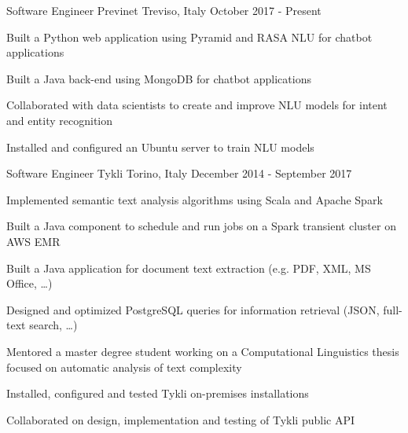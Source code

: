 

\begin{cventries}

  \cventry
    {Software Engineer} %
    {Previnet} %
    {Treviso, Italy} %
    {October 2017 - Present} %
    {
      \begin{cvitems} %
        \item {Built a Python web application using Pyramid and RASA NLU for chatbot applications}
        \item {Built a Java back-end using MongoDB for chatbot applications}
        \item {Collaborated with data scientists to create and improve NLU models for intent and entity recognition}
        \item {Installed and configured an Ubuntu server to train NLU models}
      \end{cvitems}
    }

  \cventry
    {Software Engineer} %
    {Tykli} %
    {Torino, Italy} %
    {December 2014 - September 2017} %
    {
      \begin{cvitems} %
        \item {Implemented semantic text analysis algorithms using Scala and Apache Spark}
        \item {Built a Java component to schedule and run jobs on a Spark transient cluster on AWS EMR}
        \item {Built a Java application for document text extraction (e.g. PDF, XML, MS Office, \ldots)}
        \item {Designed and optimized PostgreSQL queries for information retrieval (JSON, full-text search, \ldots)}
        \item {Mentored a master degree student working on a Computational Linguistics thesis focused on automatic analysis of text complexity}
        \item {Installed, configured and tested Tykli on-premises installations}
        \item {Collaborated on design, implementation and testing of Tykli public API}
      \end{cvitems}
    }


\end{cventries}
